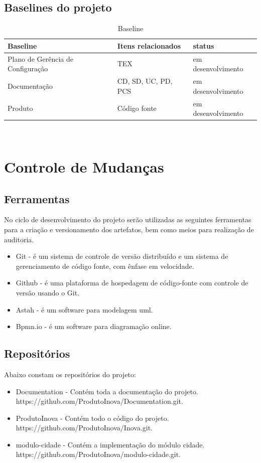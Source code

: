 \documentclass{article}
\begin{document}
          \subsection{Baselines do projeto}
          \begin{table}[H]
              \begin{tabular}{l l l}
                  \textbf{Baseline} & \textbf{Itens relacionados} & \textbf{status}\\
                  \hline
                  Plano de Gerência de Configuração & TEX & em desenvolvimento \\
                  Documentação & CD, SD, UC, PD, PCS & em desenvolvimento \\
                  Produto & Código fonte & em desenvolvimento\\
              \end{tabular}\\
              \caption{Baseline}
          \end{table}
    \section{Controle de Mudanças}
    	\subsection{Ferramentas}
        No ciclo de desenvolvimento do projeto serão utilizadas as seguintes ferramentas para a criação e versionamento dos artefatos, bem como meios para realização de auditoria.
        \begin{itemize}
          \item Git - é um sistema de controle de versão distribuído e um sistema de gerenciamento de código fonte, com ênfase em velocidade. 
          \item Github - é uma plataforma de hospedagem de código-fonte com controle de versão usando o Git.
          \item Astah - é um software para modelagem uml. 
          \item Bpmn.io - é um software para diagramação online.
        \end{itemize}
         \subsection{Repositórios}
         Abaixo constam os repositórios do projeto:
	         \begin{itemize}
		         \item Documentation - Contém toda a documentação do projeto. https://github.com/ProdutoInova/Documentation.git.
		         \item ProdutoInova - Contém todo o código do projeto. https://github.com/ProdutoInova/Inova.git.
		         \item modulo-cidade - Contém a implementação do módulo cidade. https://github.com/ProdutoInova/modulo-cidade.git.
		      \end{itemize}
\end{document}

